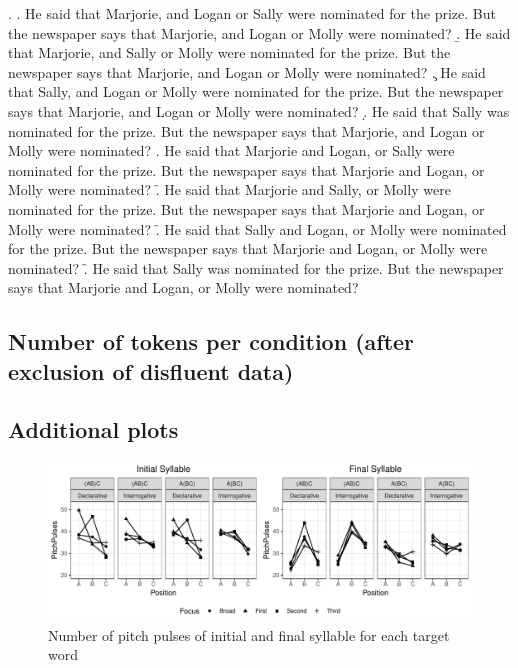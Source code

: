 \documentclass[preprint,review,12pt,authoryear,times]{elsarticle}
\begin{document}
\ex. 
\a. He said that Marjorie, and Logan or Sally were nominated for the prize. But the newspaper says that Marjorie, and Logan or Molly were nominated?
\b. He said that Marjorie, and Sally or Molly were nominated for the prize. But the newspaper says that Marjorie, and Logan or Molly were nominated?
\c. He said that Sally, and Logan or Molly were nominated for the prize. But the newspaper says that Marjorie, and Logan or Molly were nominated?
\d. He said that Sally was nominated for the prize. But the newspaper says that Marjorie, and Logan or Molly were nominated?
\e. He said that Marjorie and Logan, or Sally were nominated for the prize. But the newspaper says that  Marjorie and Logan, or Molly were nominated?
\f. He said that Marjorie and Sally, or Molly were nominated for the prize. But the newspaper says that  Marjorie and Logan, or Molly were nominated?
\f. He said that Sally and Logan, or Molly were nominated for the prize. But the newspaper says that  Marjorie and Logan, or Molly were nominated?
\f. He said that Sally was nominated for the prize. But the newspaper says that  Marjorie and Logan, or Molly were nominated?

\subsection{Number of tokens per condition (after exclusion of disfluent data)}



\newpage

\subsection{Additional plots}


\begin{figure}[htb!]
	\begin{center}
		\includegraphics[width=5in]{Figures/PitchPulses.pdf}
		\caption{Number of pitch pulses of initial and final syllable for each target word}
		\label{figurePitchPulses}
	\end{center}
\end{figure}
\end{document}
